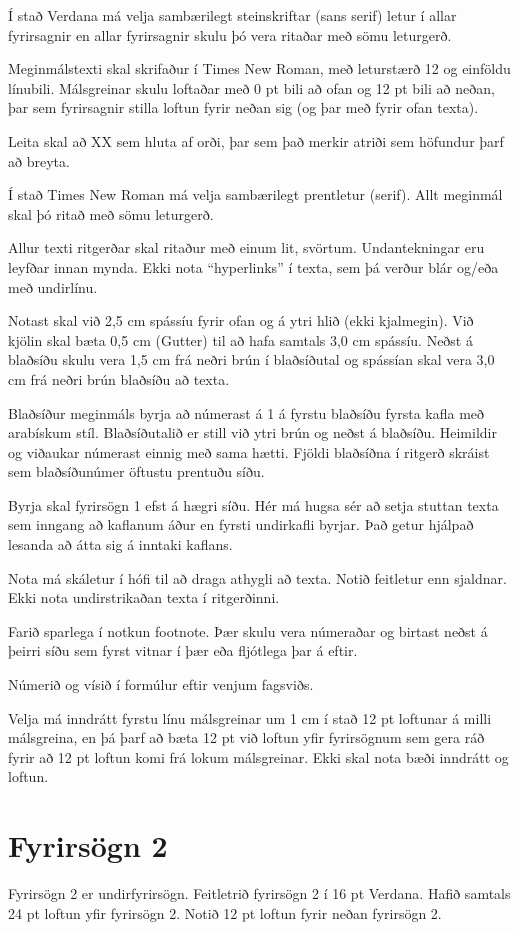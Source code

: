 \documentclass[a4paper, 12pt, twoside]{scrreprt}
\begin{document}
Í stað Verdana má velja sambærilegt steinskriftar (sans serif) letur í allar fyrirsagnir en allar fyrirsagnir skulu þó vera ritaðar með sömu leturgerð.

Meginmálstexti skal skrifaður í Times New Roman, með leturstærð 12 og einföldu línubili. Málsgreinar skulu loftaðar með 0 pt bili að ofan og 12 pt bili að neðan, þar sem fyrirsagnir stilla loftun fyrir neðan sig (og þar með fyrir ofan texta).

Leita skal að XX sem hluta af orði, þar sem það merkir atriði sem höfundur þarf að breyta.

Í stað Times New Roman má velja sambærilegt prentletur (serif). Allt meginmál skal þó ritað með sömu leturgerð. 

Allur texti ritgerðar skal ritaður með einum lit, svörtum. Undantekningar eru leyfðar innan mynda. Ekki nota “hyperlinks” í texta, sem þá verður blár og/eða með undirlínu.

Notast skal við 2,5 cm spássíu fyrir ofan og á ytri hlið (ekki kjalmegin). Við kjölin skal bæta 0,5 cm (Gutter) til að hafa samtals 3,0 cm spássíu. Neðst á blaðsíðu skulu vera 1,5 cm frá neðri brún í blaðsíðutal og spássían skal vera 3,0 cm frá neðri brún blaðsíðu að texta.

Blaðsíður meginmáls byrja að númerast á 1 á fyrstu blaðsíðu fyrsta kafla með arabískum stíl. Blaðsíðutalið er still við ytri brún og neðst á blaðsíðu. Heimildir og viðaukar númerast einnig með sama hætti. Fjöldi blaðsíðna í ritgerð skráist sem blaðsíðunúmer öftustu prentuðu síðu.

Byrja skal fyrirsögn 1 efst á hægri síðu. Hér má hugsa sér að setja stuttan texta sem inngang að kaflanum áður en fyrsti undirkafli byrjar. Það getur hjálpað lesanda að átta sig á inntaki kaflans.

Nota má skáletur í hófi til að draga athygli að texta. Notið feitletur enn sjaldnar. Ekki nota undirstrikaðan texta í ritgerðinni.

Farið sparlega í notkun footnote. Þær skulu vera númeraðar og birtast neðst á þeirri síðu sem fyrst vitnar í þær eða fljótlega þar á eftir.

Númerið og vísið í formúlur eftir venjum fagsviðs.

Velja má inndrátt fyrstu línu málsgreinar um 1 cm í stað 12 pt loftunar á milli málsgreina, en þá þarf að bæta 12 pt við loftun yfir fyrirsögnum sem gera ráð fyrir að 12 pt loftun komi frá lokum málsgreinar. Ekki skal nota bæði inndrátt og loftun.

\section{Fyrirsögn 2}
Fyrirsögn 2 er undirfyrirsögn. Feitletrið fyrirsögn 2 í 16 pt Verdana. Hafið samtals 24 pt loftun yfir fyrirsögn 2. Notið 12 pt loftun fyrir neðan fyrirsögn 2.
\end{document}
